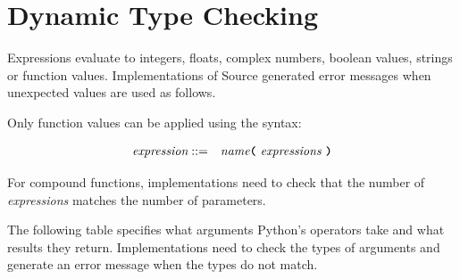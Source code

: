 
\section{Dynamic Type Checking}

Expressions evaluate to integers, floats, complex numbers, boolean values, strings or function values. 
Implementations of Source generated error messages when unexpected values are used as follows.

Only function values can be applied using the syntax:

\begin{eqnarray*}
 \textit{expression}    
                                   & ::=   &  \textit{name}
                                               \texttt{\textbf{(}}\  \textit{expressions} \
                                               \texttt{\textbf{)}}\\ 
\end{eqnarray*}

For compound functions, implementations need to check that the number of \textit{expressions}
matches the number of parameters.

The following table specifies what arguments Python's operators
take and what results they return. Implementations need to check the types of arguments and
generate an error message when the types do not match.

